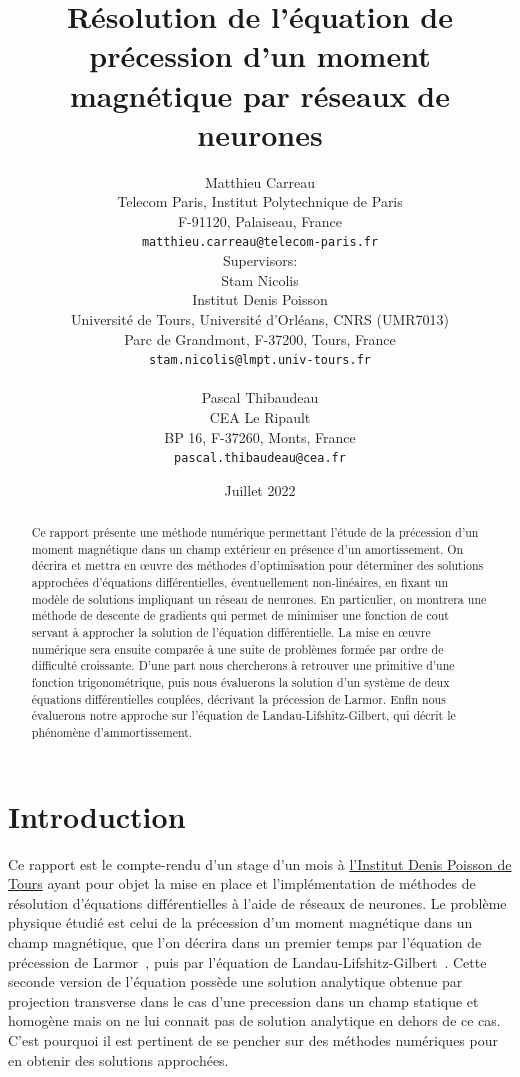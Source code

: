 \documentclass[12pt]{report}
\title{Résolution de l'équation de précession d'un moment magnétique par réseaux de neurones}
\author{
  Matthieu Carreau\\
  Telecom Paris, Institut Polytechnique de Paris\\
  F-91120, Palaiseau, France\\
  \texttt{matthieu.carreau@telecom-paris.fr} \\
  [1em] Supervisors: \\
  Stam Nicolis\\
  Institut Denis Poisson\\
  Université de Tours, Université d'Orléans, CNRS (UMR7013)\\
  Parc de Grandmont, F-37200, Tours, France\\
  \texttt{stam.nicolis@lmpt.univ-tours.fr}\\
  [1em] \\
  Pascal Thibaudeau\\
  CEA Le Ripault\\
  BP 16, F-37260, Monts, France\\
  \texttt{pascal.thibaudeau@cea.fr}
}
\date{Juillet 2022}
\begin{document}
\maketitle

\begin{abstract}
    Ce rapport présente une méthode numérique permettant l'étude de la préces\-sion d'un moment magnétique dans un champ extérieur en présence d'un amortissement.
    On décrira et mettra en {\oe}uvre des méthodes d'optimisation pour déterminer des solutions approchées d'équations différentielles, éventuellement non-linéaires, en fixant un modèle de solutions impliquant un réseau de neurones. 
    En particulier, on montrera une méthode de descente de gradients qui permet de minimiser une fonction de cout servant à approcher la solution de l'équation différentielle.
    La mise en {\oe}uvre numérique sera ensuite comparée à une suite de problèmes formée par ordre de difficulté croissante. 
    D'une part nous chercherons à retrouver une primitive d'une fonction trigonométrique, puis nous évaluerons la solution d'un système de deux équations différentielles couplées, décrivant la précession de Larmor.
    Enfin nous évaluerons notre approche sur l'équation de Landau-Lifshitz-Gilbert, qui décrit le phénomène d'ammortissement.
\end{abstract}
    
\tableofcontents{}

\chapter{Introduction}
\label{chap:introduction}

Ce rapport est le compte-rendu d'un stage d'un mois à \href{https://www.idpoisson.fr}{l'Institut Denis Poisson de Tours} ayant pour objet la mise en place et l'implémentation de méthodes de résolution d'équations différentielles à l'aide de réseaux de neurones. 
Le problème physique étudié est celui de la précession d'un moment magnétique dans un champ magnétique, que l'on décrira dans un premier temps par l'équation de précession de Larmor~\cite{PrecessionLarmor}, puis par l'équation de Landau-Lifshitz-Gilbert~\cite{EquationGilbert}.
Cette seconde version de l'équation possède une solution analytique obtenue par projection transverse dans le cas d'une precession dans un champ statique et homogène mais on ne lui connait pas de solution analytique en dehors de ce cas.
C'est pourquoi il est pertinent de se pencher sur des méthodes numériques pour en obtenir des solutions approchées.
\end{document}
